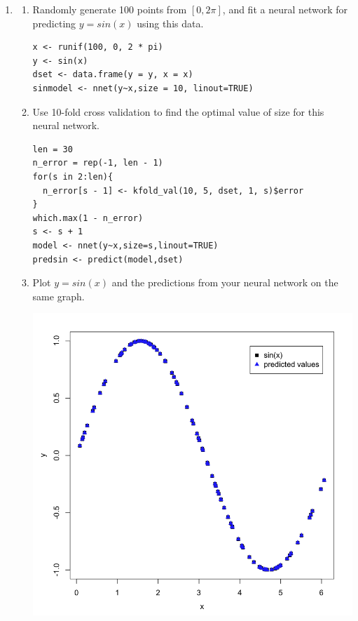 \documentclass[11pt]{article}
\begin{document}
\begin{enumerate}
\begin{enumerate}
\begin{center}
\end{center}

\end{enumerate}
\item 
\begin{enumerate}
\item Randomly generate 100 points from $[0, 2\pi]$, and fit a neural network 
for predicting $y = sin(x)$ using this data. 

\begin{Verbatim}
x <- runif(100, 0, 2 * pi)
y <- sin(x)
dset <- data.frame(y = y, x = x)
sinmodel <- nnet(y~x,size = 10, linout=TRUE)
\end{Verbatim}

\item
 Use 10-fold cross validation to find the optimal value of size for 
 this neural network. 

\begin{Verbatim}
len = 30
n_error = rep(-1, len - 1)
for(s in 2:len){
  n_error[s - 1] <- kfold_val(10, 5, dset, 1, s)$error
}
which.max(1 - n_error)
s <- s + 1
model <- nnet(y~x,size=s,linout=TRUE)
predsin <- predict(model,dset)
\end{Verbatim}

\item
 Plot $y = sin(x)$ and the predictions from your neural network on the 
 same graph. 

\begin{center}
\includegraphics[scale=0.35]{sinvs_computed}
\end{center}

\end{enumerate}

\end{enumerate}
\end{document}
